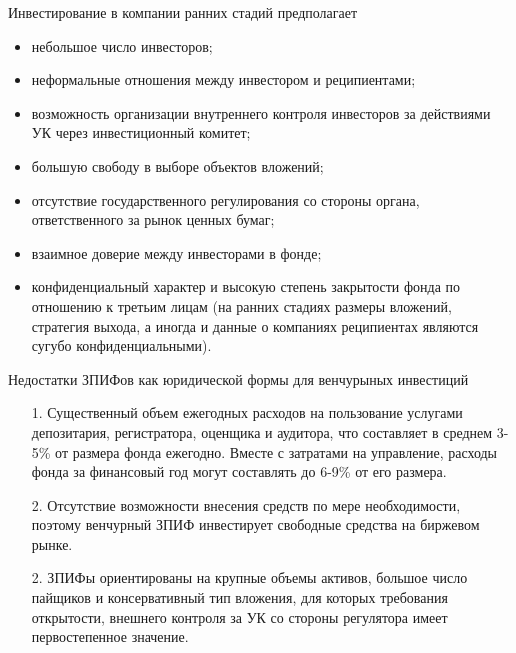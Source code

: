 \documentclass[_Venture_p1.tex]{subfiles}
\begin{document}
\begin{frame}[allowframebreaks]{Инвестирование в компании ранних стадий предполагает}
\begin{itemize}
	\item небольшое число инвесторов;
	\item неформальные отношения между инвестором и реципиентами;
	\item возможность организации внутреннего контроля инвесторов за действиями  УК через инвестиционный комитет;
	
	\pagebreak
	\item большую свободу в выборе объектов вложений;
	\item отсутствие государственного регулирования со стороны органа, ответственного за рынок ценных бумаг;
	
	\pagebreak
	\item взаимное доверие между инвесторами в фонде;
	\item конфиденциальный характер и высокую степень закрытости фонда по отношению к третьим лицам (на ранних стадиях размеры вложений, стратегия выхода, а иногда и данные о компаниях реципиентах являются сугубо конфиденциальными).
\end{itemize}
\end{frame}

\begin{frame}[allowframebreaks]{Недостатки ЗПИФов }{как юридической формы для венчурыных инвестиций}
\begin{itemize}
	\small
	\item[1.] Существенный объем ежегодных расходов на пользование услугами депозитария, регистратора, оценщика и аудитора, что составляет в среднем 3-5\% от размера фонда ежегодно. Вместе с затратами на управление, расходы фонда за финансовый год могут составлять до 6-9\% от его размера.
	
	\pagebreak
	\item[2.] Отсутствие возможности внесения средств по мере необходимости, поэтому венчурный ЗПИФ инвестирует свободные средства на биржевом рынке.
	\item[2.] ЗПИФы ориентированы на крупные объемы активов, большое число пайщиков и консервативный тип вложения, для которых требования открытости, внешнего контроля за УК со стороны регулятора имеет первостепенное значение.
\end{itemize}
\end{frame}
\end{document}
